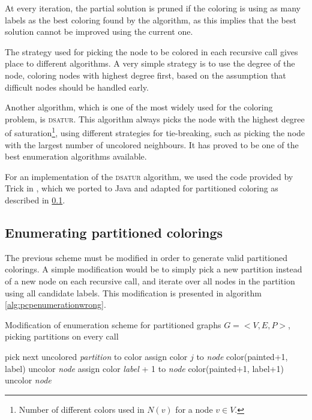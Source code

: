 At every iteration, the partial solution is pruned if the coloring is using as many labels as the best coloring found by the algorithm, as this implies that the best solution cannot be improved using the current one.

The strategy used for picking the node to be colored in each recursive call gives place to different algorithms. A very simple strategy is to use the degree of the node, coloring nodes with highest degree first, based on the assumption that difficult nodes should be handled early.

Another algorithm, which is one of the most widely used for the coloring problem, is \textsc{dsatur}\cite{brelaz1979new}. This algorithm always picks the node with the highest degree of saturation\footnote{Number of different colors used in $N(v)$ for a node $v \in V$.}, using different strategies for tie-breaking, such as picking the node with the largest number of uncolored neighbours\cite{sewell1996improved}. It has proved to be one of the best enumeration algorithms available.

For an implementation of the \textsc{dsatur} algorithm, we used the code provided by Trick in \cite{trickdsatur}, which we ported to Java and adapted for partitioned coloring as described in \ref{subsec:heur:enumpcp}.

\subsection{Enumerating partitioned colorings}
\label{subsec:heur:enumpcp}

The previous scheme must be modified in order to generate valid partitioned colorings. A simple modification would be to simply pick a new partition instead of a new node on each recursive call, and iterate over all nodes in the partition using all candidate labels. This modification is presented in algorithm \ref{alg:pcpenumerationwrong}. 

\begin{algorithm}
\caption{Modification of enumeration scheme for partitioned graphs $G = <V,E,P>$, picking partitions on every call}
\label{alg:pcpenumerationwrong}

\begin{algorithmic}
		\STATE pick next uncolored \textit{partition} to color		
					\STATE assign color $j$ to \textit{node}
					\CALL color(painted+1, label)
					\STATE uncolor \textit{node}
				\ENDIF
			\ENDFOR
			\STATE assign color \textit{label} + 1 to \textit{node}
			\CALL color(painted+1, label+1)
			\STATE uncolor \textit{node}
		\ENDFOR
\end{algorithmic}
\end{algorithm}

